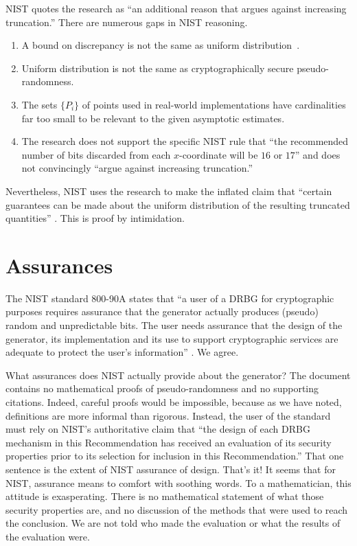\documentclass[11pt]{amsart} %
\begin{document}
NIST quotes the research \cite{MS2000} as ``an additional reason that argues against increasing truncation.''
There are numerous gaps in NIST reasoning.
\begin{enumerate}
\item A bound on discrepancy is not the same as uniform distribution~\cite{SDA1651}.
\item Uniform distribution is not the same as cryptographically secure pseudo-randomness.
\item The sets $\{P_i\}$ of points  used in real-world implementations have cardinalities far too small to
be relevant to the given asymptotic estimates.
\item The research does not support the specific NIST rule that ``the recommended number of bits discarded
from each $x$-coordinate will be $16$ or $17$'' and does not convincingly ``argue against increasing truncation.''
\end{enumerate}
Nevertheless, NIST uses the research to make the inflated claim that ``certain
guarantees can be made about the uniform distribution of the resulting truncated quantities'' \cite{NIST}.
This is proof by intimidation.

\section{Assurances}

The NIST standard 800-90A states that ``a user of a DRBG for cryptographic purposes requires assurance
that the generator actually produces (pseudo) random and unpredictable bits.  The user needs assurance
that the design of the generator, its implementation and its use to support cryptographic services are
adequate to protect the user's information'' \cite{NIST}. We agree.

What assurances does NIST actually provide about the generator?  
The document contains no mathematical proofs of pseudo-randomness and no supporting citations.  
Indeed, careful proofs would be impossible,
because as we have noted,
definitions are more informal than rigorous.  Instead, the user of the standard must
rely on NIST's authoritative claim that ``the design of each DRBG mechanism in this Recommendation has
received an evaluation of its security properties prior to its selection for inclusion in this Recommendation.''
That one sentence is the extent of NIST assurance of design.  That's it!  It seems that for NIST,
assurance means to comfort with soothing words. To a mathematician, this attitude is exasperating.
 There is no mathematical statement of what
those security properties are, and no discussion of the methods that were used to reach the conclusion.
We are not told who made the evaluation or what the results of the evaluation were.
\end{document}
